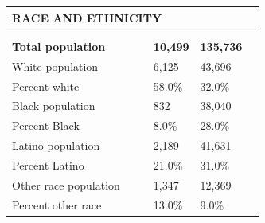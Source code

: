 \documentclass[9pt]{report}
\begin{document}
\vspace{12pt}
\setlength{\tabcolsep}{.01in} %
\begin{tabular}{p{.10in}p{.10in}p{.10in}p{3.7in}>{\hfill}p{.85in}>{\hfill}p{.85in}>{\hfill}p{.85in}>{\hfill}p{.85in}p{0.1in}}
\multicolumn{9}{l}{\parbox{7.1in}{\raggedright{\large{\strut\textbf{RACE AND ETHNICITY}\strut}}}} \\ 
\hline
\multicolumn{4}{l}{\parbox{3.5in}{\raggedright{\textbf{}}}} & \multicolumn{1}{r}{\parbox{.85in}{\strut\raggedleft{\textbf{}\strut}}} & \multicolumn{1}{r}{\parbox{.85in}{\strut\raggedleft{\textbf{}\strut}}} & \multicolumn{1}{r}{\parbox{.85in}{\strut{}}} & \multicolumn{1}{r}{\parbox{.85in}{\strut{}}} & \\ 
\multicolumn{9}{l}{} \\ 
\multicolumn{4}{l}{\parbox{3.5in}{\strut\raggedright{\textbf{Total population}\strut}}} & \textbf{} & \textbf{} & \textbf{10,499} & \textbf{135,736} & \textbf{} \\ 
\multicolumn{4}{l}{\parbox{3.6in}{\strut\raggedright{{White population}}\strut}} &  &  & 6,125 & 43,696 & \multicolumn{1}{l}{}  \\ 
\multicolumn{4}{l}{\parbox{3.6in}{\strut\raggedright{{Percent white}}\strut}} &  &  & 58.0\% & 32.0\% & \multicolumn{1}{l}{}  \\ 
\multicolumn{4}{l}{\parbox{3.6in}{\strut\raggedright{{Black population}}\strut}} &  &  & 832 & 38,040 & \multicolumn{1}{l}{}  \\ 
\multicolumn{4}{l}{\parbox{3.6in}{\strut\raggedright{{Percent Black}}\strut}} &  &  & 8.0\% & 28.0\% & \multicolumn{1}{l}{}  \\ 
\multicolumn{4}{l}{\parbox{3.6in}{\strut\raggedright{{Latino population}}\strut}} &  &  & 2,189 & 41,631 & \multicolumn{1}{l}{}  \\ 
\multicolumn{4}{l}{\parbox{3.6in}{\strut\raggedright{{Percent Latino}}\strut}} &  &  & 21.0\% & 31.0\% & \multicolumn{1}{l}{}  \\ 
\multicolumn{4}{l}{\parbox{3.6in}{\strut\raggedright{{Other race population}}\strut}} &  &  & 1,347 & 12,369 & \multicolumn{1}{l}{}  \\ 
\multicolumn{4}{l}{\parbox{3.6in}{\strut\raggedright{{Percent other race}}\strut}} &  &  & 13.0\% & 9.0\% & \multicolumn{1}{l}{}  \\ 

\end{tabular}
\setlength{\tabcolsep}{6pt} %
\end{document}
